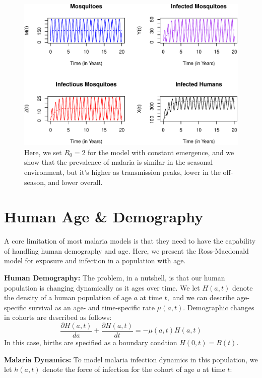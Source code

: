 \documentclass[
]{book}
\begin{document}
\begin{figure}
\centering
\includegraphics{docs/figs/compareTS-1.pdf}
\caption{\label{fig:compareTS}Here, we set \(R_0= 2\) for the model with constant emergence, and we show that the prevalence of malaria is similar in the seasonal environment, but it's higher as transmission peaks, lower in the off-season, and lower overall.}
\end{figure}

\chapter{Human Age \& Demography}\label{human-age-demography}

A core limitation of most malaria models is that they need to have the capability of handling human demography and age. Here, we present the Ross-Macdonald model for exposure and infection in a population with age.

\textbf{Human Demography:} The problem, in a nutshell, is that our human population is changing dynamically as it ages over time. We let \(H(a,t)\) denote the density of a human population of age \(a\) at time \(t,\) and we can describe age-specific survival as an age- and time-specific rate \(\mu(a,t).\) Demographic changes in cohorts are described as follows:\\
\[
\frac{\partial H(a,t)}{da} + \frac{\partial H(a,t)}{dt} = -\mu(a,t) H(a,t)
\]
In this case, births are specified as a boundary condtion \(H(0,t) = B(t).\)

\textbf{Malaria Dynamics:} To model malaria infection dynamics in this population, we let \(h(a,t)\) denote the force of infection for the cohort of age \(a\) at time \(t\):
\end{document}
